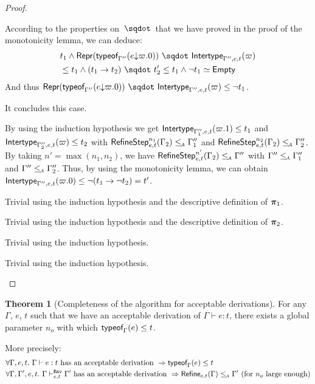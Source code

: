 \documentclass[a4paper]{article}
\theoremstyle{definition}
\newtheorem{theorem}{Theorem}
\begin{document}
\begin{proof}
\begin{description}
\begin{description}
      According to the properties on $\worra {} {}$ that we have proved in the proof of the monotonicity lemma,
      we can deduce:
      \begin{align*}
      &t_1 \land \worra {\tsrep{\tyof {\occ e {\varpi.0}} {\Gamma''}}} {\env {\Gamma'',e,t} (\varpi)}\\
      &\leq t_1 \land \worra {(\arrow {t_1} {t_2})} {t_2'} \leq t_1 \land \neg t_1 \simeq \Empty
      \end{align*}
      And thus $\worra {\tsrep{\tyof {\occ e {\varpi.0}} {\Gamma''}}} {\env {\Gamma'',e,t} (\varpi)} \leq \neg t_1$.

      It concludes this case.

      \item[\Rule{PAppL}] By using the induction hypothesis we get
      $\textsf{Intertype}_{\Gamma_1'',e,t} (\varpi.1) \leq t_1$ and $\textsf{Intertype}_{\Gamma_2'',e,t} (\varpi) \leq t_2$
      with $\textsf{RefineStep}_{e,t}^{n_1} (\Gamma_2) \leq_{\!\scriptscriptstyle\mathcal{A}} \Gamma_1''$ and
      $\textsf{RefineStep}_{e,t}^{n_2} (\Gamma_2) \leq_{\!\scriptscriptstyle\mathcal{A}} \Gamma_2''$. By taking $n'=\max (n_1,n_2)$,
      we have $\textsf{RefineStep}_{e,t}^{n'} (\Gamma_2) \leq_{\!\scriptscriptstyle\mathcal{A}} \Gamma''$ with $\Gamma'' \leq_{\!\scriptscriptstyle\mathcal{A}} \Gamma_1''$ and $\Gamma'' \leq_{\!\scriptscriptstyle\mathcal{A}} \Gamma_2''$.
      Thus, by using the monotonicity lemma, we can obtain $\textsf{Intertype}_{\Gamma'',e,t} (\varpi.0) \leq \neg (t_1\to \neg t_2) = t'$.
  
      \item[\Rule{PPairL}] Trivial using the induction hypothesis and the descriptive definition of $\boldsymbol{\pi}_1$.
      \item[\Rule{PPairR}] Trivial using the induction hypothesis and the descriptive definition of $\boldsymbol{\pi}_2$.
      \item[\Rule{PFst}] Trivial using the induction hypothesis.
      \item[\Rule{PSnd}] Trivial using the induction hypothesis.
    \end{description}
  \end{description}
  \end{proof}

  \begin{theorem}[Completeness of the algorithm for acceptable derivations]
    For any $\Gamma$, $e$, $t$ such that we have an acceptable derivation of $\Gamma \vdash e:t$, there exists a global parameter $n_o$
    with which $\textsf{typeof}_{\Gamma}(e) \leq t$.

    More precisely:
    \begin{align*}
      &\forall \Gamma, e, t.\ \Gamma \vdash e:t \text{ has an acceptable derivation } \Rightarrow \textsf{typeof}_{\Gamma}(e) \leq t\\
      &\forall \Gamma, \Gamma', e, t.\ \Gamma \vdash^{\texttt{Env}}_{e,t} \Gamma' \text{ has an acceptable derivation } \Rightarrow \textsf{Refine}_{e,t}(\Gamma) \leq_{\!\scriptscriptstyle\mathcal{A}} \Gamma' \text{ (for $n_o$ large enough)}
    \end{align*}
  \end{theorem}
\end{document}
